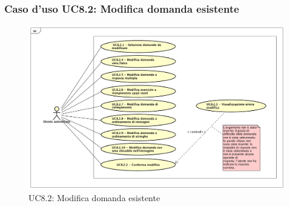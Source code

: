 	\subsubsection{Caso d'uso UC8.2: Modifica domanda esistente}
	\label{UC8.2}
	\begin{figure}[h]
		\centering
			\includegraphics[scale=0.41,keepaspectratio]{UML/UC8_2.png}
		\caption{UC8.2: Modifica domanda esistente}
	\end{figure}
	\FloatBarrier
